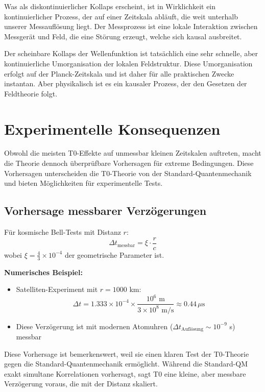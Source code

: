 	Was als diskontinuierlicher Kollaps erscheint, ist in Wirklichkeit ein kontinuierlicher Prozess, der auf einer Zeitskala abläuft, die weit unterhalb unserer Messauflösung liegt. Der Messprozess ist eine lokale Interaktion zwischen Messgerät und Feld, die eine Störung erzeugt, welche sich kausal ausbreitet.
	
	Der scheinbare Kollaps der Wellenfunktion ist tatsächlich eine sehr schnelle, aber kontinuierliche Umorganisation der lokalen Feldstruktur. Diese Umorganisation erfolgt auf der Planck-Zeitskala und ist daher für alle praktischen Zwecke instantan. Aber physikalisch ist es ein kausaler Prozess, der den Gesetzen der Feldtheorie folgt.
	
	\section{Experimentelle Konsequenzen}
	
	Obwohl die meisten T0-Effekte auf unmessbar kleinen Zeitskalen auftreten, macht die Theorie dennoch überprüfbare Vorhersagen für extreme Bedingungen. Diese Vorhersagen unterscheiden die T0-Theorie von der Standard-Quantenmechanik und bieten Möglichkeiten für experimentelle Tests.
	
	\subsection{Vorhersage messbarer Verzögerungen}
	
	Für kosmische Bell-Tests mit Distanz $r$:
	\begin{equation}
		\Delta t_{\text{messbar}} = \xi \cdot \frac{r}{c}
	\end{equation}
	wobei $\xi = \frac{4}{3} \times 10^{-4}$ der geometrische Parameter ist.
	
	\textbf{Numerisches Beispiel:}
	\begin{itemize}
		\item Satelliten-Experiment mit $r = 1000$ km:
		\begin{equation}
			\Delta t = 1.333 \times 10^{-4} \times \frac{10^6 \text{ m}}{3 \times 10^8 \text{ m/s}} \approx 0.44 \, \mu\text{s}
		\end{equation}
		\item Diese Verzögerung ist mit modernen Atomuhren ($\Delta t_{\text{Auflösung}} \sim 10^{-9}$ s) messbar
	\end{itemize}
	
	Diese Vorhersage ist bemerkenswert, weil sie einen klaren Test der T0-Theorie gegen die Standard-Quantenmechanik ermöglicht. Während die Standard-QM exakt simultane Korrelationen vorhersagt, sagt T0 eine kleine, aber messbare Verzögerung voraus, die mit der Distanz skaliert.
	
